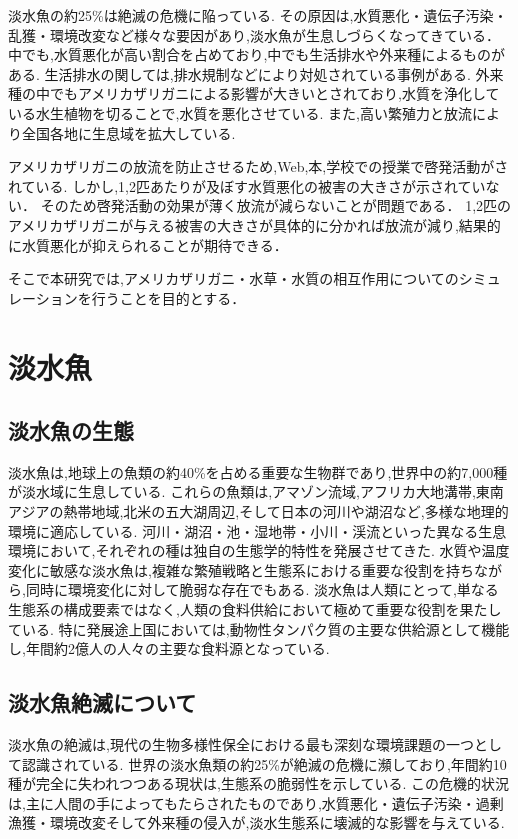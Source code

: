 \documentclass[12pt,a4j,titlepage]{ltjsarticle}
\begin{document}
淡水魚の約25\%は絶滅の危機に陥っている.\cite{FreshWater}
その原因は,水質悪化・遺伝子汚染・乱獲・環境改変など様々な要因があり,淡水魚が生息しづらくなってきている．
中でも,水質悪化が高い割合を占めており,中でも生活排水や外来種によるものがある.
生活排水の関しては,排水規制などにより対処されている事例がある.
外来種の中でもアメリカザリガニによる影響が大きいとされており,水質を浄化している水生植物を切ることで,水質を悪化させている.
また,高い繁殖力と放流により全国各地に生息域を拡大している.

アメリカザリガニの放流を防止させるため,Web,本,学校での授業で啓発活動がされている.
しかし,1,2匹あたりが及ぼす水質悪化の被害の大きさが示されていない．
そのため啓発活動の効果が薄く放流が減らないことが問題である．
1,2匹のアメリカザリガニが与える被害の大きさが具体的に分かれば放流が減り,結果的に水質悪化が抑えられることが期待できる．

そこで本研究では,アメリカザリガニ・水草・水質の相互作用についてのシミュレーションを行うことを目的とする．
\clearpage

\section{淡水魚}\label{淡水魚}
\subsection{淡水魚の生態}

淡水魚は,地球上の魚類の約40\%を占める重要な生物群であり,世界中の約7,000種が淡水域に生息している.
これらの魚類は,アマゾン流域,アフリカ大地溝帯,東南アジアの熱帯地域,北米の五大湖周辺,そして日本の河川や湖沼など,多様な地理的環境に適応している.\cite{FreshWater}
河川・湖沼・池・湿地帯・小川・渓流といった異なる生息環境において,それぞれの種は独自の生態学的特性を発展させてきた.
水質や温度変化に敏感な淡水魚は,複雑な繁殖戦略と生態系における重要な役割を持ちながら,同時に環境変化に対して脆弱な存在でもある.
淡水魚は人類にとって,単なる生態系の構成要素ではなく,人類の食料供給において極めて重要な役割を果たしている.
特に発展途上国においては,動物性タンパク質の主要な供給源として機能し,年間約2億人の人々の主要な食料源となっている.

\subsection{淡水魚絶滅について}
淡水魚の絶滅は,現代の生物多様性保全における最も深刻な環境課題の一つとして認識されている.
世界の淡水魚類の約25\%が絶滅の危機に瀕しており,年間約10種が完全に失われつつある現状は,生態系の脆弱性を示している.
この危機的状況は,主に人間の手によってもたらされたものであり,水質悪化・遺伝子汚染・過剰漁獲・環境改変そして外来種の侵入が,淡水生態系に壊滅的な影響を与えている.
\end{document}
